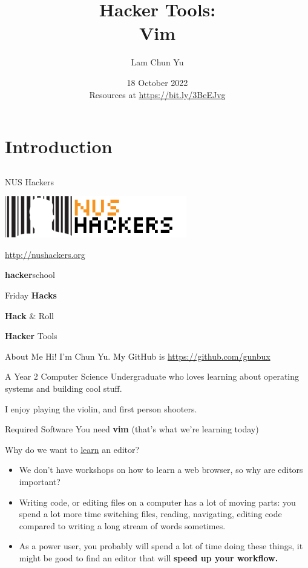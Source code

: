 \documentclass[12pt]{beamer}
\title{Hacker Tools: \\Vim}
\author{Lam Chun Yu}
\date{18 October 2022 \\ Resources at \url{https://bit.ly/3BeEJvg}}
\begin{document}
\frame[plain]{\titlepage}

\section{Introduction}
\subsection{}

\begin{frame}{NUS Hackers}

  \begin{center}
    \includegraphics[width=0.5\linewidth]{../NUSHackers}

    \url{http://nushackers.org}
  \end{center}

  \begin{center}
    \textbf{hacker}school

    Friday \textbf{Hacks}

    \textbf{Hack} \& Roll

    \textbf{Hacker} Tools
  \end{center}

\end{frame}

\begin{frame}{About Me}
  Hi! I'm Chun Yu. My GitHub is \url{https://github.com/gunbux}

  A Year 2 Computer Science Undergraduate who loves learning about operating systems and building cool stuff.

  I enjoy playing the violin, and first person shooters.

\end{frame}

\begin{frame}{Required Software}
  You need \textbf{vim} (that's what we're learning today)
\end{frame}

\begin{frame}{Why do we want to \underline{learn} an editor?}
  \begin{itemize}
    \item We don't have workshops on how to learn a web browser, so why are editors important?
    \item Writing code, or editing files on a computer has a lot of moving parts: you spend a lot more time switching files, reading, navigating, editing code compared to writing a long stream of words sometimes.
    \item As a power user, you probably will spend a lot of time doing these things, it might be good to find an editor that will \textbf{speed up your workflow.}
  \end{itemize}
\end{frame}
\end{document}
